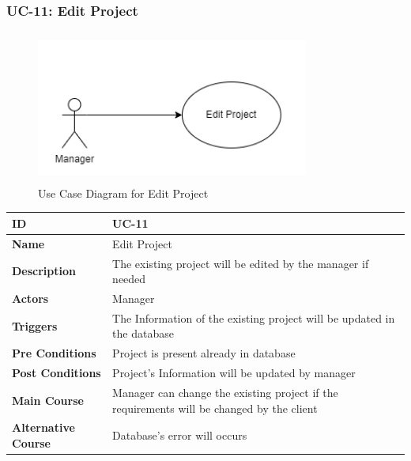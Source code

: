 \newpage

\subsubsection{UC-11: Edit Project}
\begin{figure}[H]
    \includegraphics[height=5cm, width=0.8\textwidth]{./diagrams/Use Case/u11.png}
    \centering
    \caption{Use Case Diagram for Edit Project}
    \label{fig:Usecase1}
\end{figure}

\begin{center}
    \begin{tabularx}{\textwidth}{|l|X|}
        \hline
        \textbf{ID}                 & UC-11                                                                                     \\
        \hline
        \textbf{Name}               & Edit Project                                                                              \\
        \hline
        \textbf{Description}        & The existing project will be edited by the manager if needed                              \\
        \hline
        \textbf{Actors}             & Manager                                                                                   \\
        \hline
        \textbf{Triggers}           & The Information of the existing project will be updated in the database                   \\
        \hline
        \textbf{Pre Conditions}     & Project is present already in database                                                    \\
        \hline
        \textbf{Post Conditions}    & Project's Information will be updated by manager                                          \\
        \hline
        \textbf{Main Course}        & Manager can change the existing project if the requirements will be changed by the client \\
        \hline
        \textbf{Alternative Course} & Database's error will occurs                                                              \\
        \hline
    \end{tabularx}
\end{center}
\newpage



